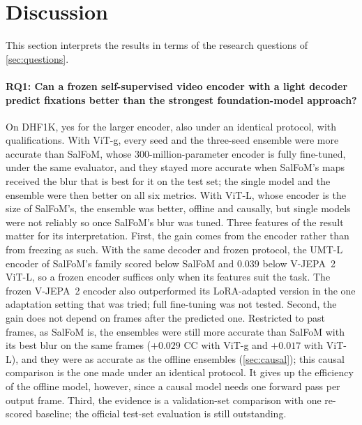 \section{Discussion}\label{sec:discussion}

This section interprets the results in terms of the research questions of
\cref{sec:questions}.

\paragraph{RQ1: Can a frozen self-supervised video encoder with a light decoder
predict fixations better than the strongest foundation-model approach?} On
DHF1K, yes for the larger encoder, also under an identical protocol, with
qualifications. With \acrshort{ViT}-g, every seed and
the three-seed ensemble were more accurate than SalFoM, whose 300-million-parameter
encoder is fully fine-tuned, under the same evaluator, and they stayed more
accurate when SalFoM's maps received the blur that is best for it on the test
set; the single model and the ensemble were then better on all six metrics.
With \acrshort{ViT}-L, whose encoder is the size of SalFoM's, the ensemble was better, offline
and causally, but single models were not reliably so once SalFoM's blur was
tuned.
Three features of the result matter for its interpretation. First, the gain
comes from the encoder rather than from freezing as such. With the same decoder
and frozen protocol, the \acrshort{UMT}-L encoder of SalFoM's family scored below SalFoM and
0.039 below \acrshort{V-JEPA}~2 \acrshort{ViT}-L, so a frozen encoder suffices only when its features
suit the task. The frozen \acrshort{V-JEPA}~2 encoder also outperformed its \acrshort{LoRA}-adapted
version in the one adaptation setting that was tried; full fine-tuning was not
tested. Second, the gain does not depend on frames after the predicted one.
Restricted to past frames, as SalFoM is, the ensembles were still more accurate
than SalFoM with its best blur on the same frames ($+0.029$ \acrshort{CC} with \acrshort{ViT}-g and
$+0.017$ with \acrshort{ViT}-L), and they were as accurate as the offline ensembles
(\cref{sec:causal}); this causal comparison is the one made under an identical
protocol. It gives up the
efficiency of the offline model, however, since a causal model needs one forward
pass per output frame. Third, the evidence is a validation-set comparison with
one re-scored baseline; the official test-set evaluation is still outstanding.

